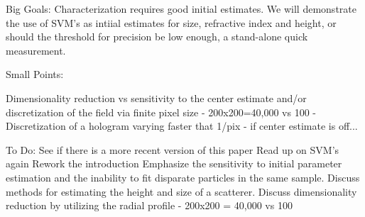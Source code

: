 Big Goals:
Characterization requires good initial estimates.
We will demonstrate the use of SVM's as intiial estimates for size, refractive
index and height, or should the threshold for precision be low enough, a stand-alone
quick measurement.

Small Points:

Dimensionality reduction vs sensitivity to the center estimate and/or discretization
of the field via finite pixel size
- 200x200=40,000 vs 100
- Discretization of a hologram varying faster that 1/pix
- if center estimate is off...


To Do:
    See if there is a more recent version of this paper
    Read up on SVM's again
    Rework the introduction
    Emphasize the sensitivity to initial parameter estimation
    and the inability to fit disparate particles in the same
    sample.
    Discuss methods for estimating the height and size of a scatterer.
    Discuss dimensionality reduction by utilizing the radial profile
    - 200x200 = 40,000 vs 100
    
